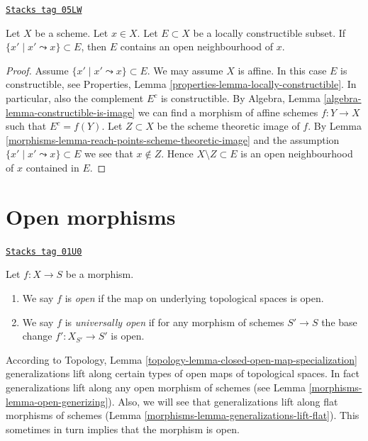 \begin{lemma}
\label{morphisms-lemma-constructible-containing-open}
\href{https://stacks.math.columbia.edu/tag/05LW}{\texttt{Stacks tag 05LW}}

Let $X$ be a scheme. Let $x \in X$. Let $E \subset X$ be a locally
constructible subset. If $\{x' \mid x' \leadsto x\} \subset E$,
then $E$ contains an open neighbourhood of $x$.
\end{lemma}

\begin{proof}

Assume $\{x' \mid x' \leadsto x\} \subset E$.
We may assume $X$ is affine.
In this case $E$ is constructible, see
Properties, Lemma \ref{properties-lemma-locally-constructible}.
In particular, also the complement $E^c$ is constructible. By
Algebra, Lemma \ref{algebra-lemma-constructible-is-image}
we can find a morphism of affine schemes $f : Y \to X$ such that
$E^c = f(Y)$. Let $Z \subset X$ be the scheme theoretic image of $f$. By
Lemma \ref{morphisms-lemma-reach-points-scheme-theoretic-image}
and the assumption $\{x' \mid x' \leadsto x\} \subset E$
we see that $x \not \in Z$. Hence $X \setminus Z \subset E$ is an
open neighbourhood of $x$ contained in $E$.
\end{proof}

\section{Open morphisms}
\label{morphisms-section-open}
\begin{definition}[Open]
\label{morphisms-definition-open}
\href{https://stacks.math.columbia.edu/tag/01U0}{\texttt{Stacks tag 01U0}}

Let $f : X \to S$ be a morphism.
\begin{enumerate}
\item We say $f$ is {\it open} if the map on underlying
topological spaces is open.
\item We say $f$ is {\it universally open} if for any morphism of
schemes $S' \to S$ the base change $f' : X_{S'} \to S'$ is open.
\end{enumerate}
\end{definition}

According to
Topology, Lemma \ref{topology-lemma-closed-open-map-specialization}
generalizations lift along certain types of open maps of topological
spaces. In fact generalizations lift along any open morphism of schemes
(see
Lemma \ref{morphisms-lemma-open-generizing}).
Also, we will see that generalizations lift along flat morphisms
of schemes (Lemma \ref{morphisms-lemma-generalizations-lift-flat}).
This sometimes in turn implies that the morphism is open.


